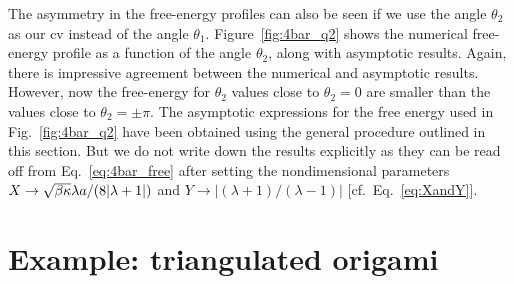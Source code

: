 The asymmetry in the free-energy profiles can also be seen if we use the angle $\theta_{2}$ as our \ac{cv} instead of the angle $\theta_{1}$.
Figure~\ref{fig:4bar_q2} shows the numerical free-energy profile as a function of the angle $\theta_{2}$, along with asymptotic results.
Again, there is impressive agreement between the numerical and asymptotic results.
However, now the free-energy for $\theta_{2}$ values close to $\theta_{2} = 0$ are smaller than the values close to $\theta_{2} = \pm\pi$.
The asymptotic expressions for the free energy used in Fig.~\ref{fig:4bar_q2} have been obtained using the general procedure outlined in this section.
But we do not write down the results explicitly as they can be read off from Eq.~\eqref{eq:4bar_free} after setting the nondimensional parameters $X \to \sqrt{\beta\kappa}\lambda a/(8\lvert\lambda+1\rvert)$ and $Y \to \left|(\lambda+1)/(\lambda-1)\right|$ [cf.~Eq.~\eqref{eq:XandY}].


\section{Example: triangulated origami}
\label{sec:origami}

